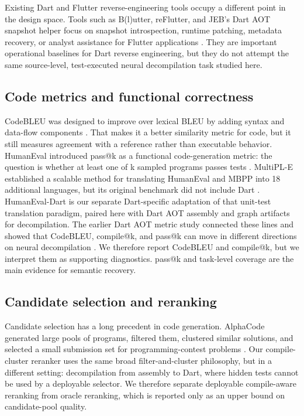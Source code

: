 \documentclass[11pt]{article}
\begin{document}
Existing Dart and Flutter reverse-engineering tools occupy a different point in the design space. Tools such as B(l)utter, reFlutter, and JEB's Dart AOT snapshot helper focus on snapshot introspection, runtime patching, metadata recovery, or analyst assistance for Flutter applications \cite{blutter,reflutter,jebdartaot}. They are important operational baselines for Dart reverse engineering, but they do not attempt the same source-level, test-executed neural decompilation task studied here.

\subsection{Code metrics and functional correctness}

CodeBLEU was designed to improve over lexical BLEU by adding syntax and data-flow components \cite{ren2020codebleu}. That makes it a better similarity metric for code, but it still measures agreement with a reference rather than executable behavior. HumanEval introduced pass@k as a functional code-generation metric: the question is whether at least one of k sampled programs passes tests \cite{chen2021codex}. MultiPL-E established a scalable method for translating HumanEval and MBPP into 18 additional languages, but its original benchmark did not include Dart \cite{cassano2023multiple}. HumanEval-Dart is our separate Dart-specific adaptation of that unit-test translation paradigm, paired here with Dart AOT assembly and graph artifacts for decompilation. The earlier Dart AOT metric study connected these lines and showed that CodeBLEU, compile@k, and pass@k can move in different directions on neural decompilation \cite{abualazm2026tosem}. We therefore report CodeBLEU and compile@k, but we interpret them as supporting diagnostics. pass@k and task-level coverage are the main evidence for semantic recovery.

\subsection{Candidate selection and reranking}

Candidate selection has a long precedent in code generation. AlphaCode generated large pools of programs, filtered them, clustered similar solutions, and selected a small submission set for programming-contest problems \cite{li2022alphacode}. Our compile-cluster reranker uses the same broad filter-and-cluster philosophy, but in a different setting: decompilation from assembly to Dart, where hidden tests cannot be used by a deployable selector. We therefore separate deployable compile-aware reranking from oracle reranking, which is reported only as an upper bound on candidate-pool quality.
\end{document}
